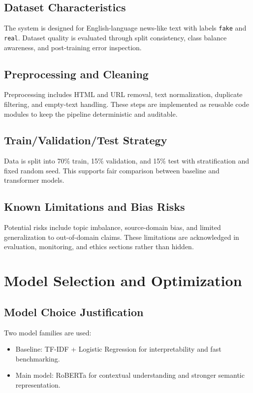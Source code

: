 \documentclass[11pt,a4paper]{article}
\begin{document}
\subsection{Dataset Characteristics}
The system is designed for English-language news-like text with labels \texttt{fake} and \texttt{real}. Dataset quality is evaluated through split consistency, class balance awareness, and post-training error inspection.

\subsection{Preprocessing and Cleaning}
Preprocessing includes HTML and URL removal, text normalization, duplicate filtering, and empty-text handling. These steps are implemented as reusable code modules to keep the pipeline deterministic and auditable.

\subsection{Train/Validation/Test Strategy}
Data is split into 70\% train, 15\% validation, and 15\% test with stratification and fixed random seed. This supports fair comparison between baseline and transformer models.

\subsection{Known Limitations and Bias Risks}
Potential risks include topic imbalance, source-domain bias, and limited generalization to out-of-domain claims. These limitations are acknowledged in evaluation, monitoring, and ethics sections rather than hidden.

\section{Model Selection and Optimization}
\subsection{Model Choice Justification}
Two model families are used:
\begin{itemize}[leftmargin=1.2em]
  \item Baseline: TF-IDF + Logistic Regression for interpretability and fast benchmarking.
  \item Main model: RoBERTa for contextual understanding and stronger semantic representation.
\end{itemize}
\end{document}
